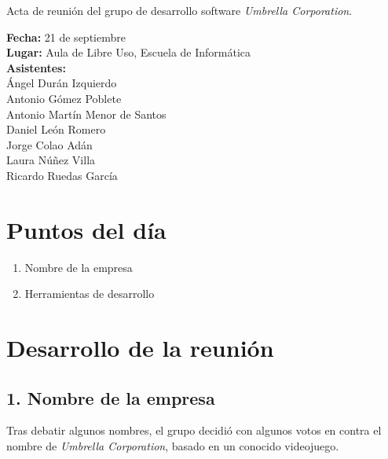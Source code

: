 \documentclass[a4paper,11pt,oneside]{article}
\begin{document}
\pagestyle{fancy}


\begin{center}
{\Large
Acta de reunión del grupo de desarrollo software \textit{Umbrella
Corporation}.}
\end{center}
\textbf{Fecha:} 21 de septiembre\\
\textbf{Lugar:} Aula de Libre Uso, Escuela de Informática\\
\textbf{Asistentes:}\\
\hspace*{1cm}Ángel Durán Izquierdo\\
\hspace*{1cm}Antonio Gómez Poblete\\
\hspace*{1cm}Antonio Martín Menor de Santos\\
\hspace*{1cm}Daniel León Romero\\
\hspace*{1cm}Jorge Colao Adán\\
\hspace*{1cm}Laura Núñez Villa\\
\hspace*{1cm}Ricardo Ruedas García


\section*{Puntos del día}

\begin{enumerate}
\item Nombre de la empresa
\item Herramientas de desarrollo
\end{enumerate}


\section*{Desarrollo de la reunión}

\subsection*{1. Nombre de la empresa}

Tras debatir algunos nombres, el grupo decidió con algunos votos en contra el
nombre de \textit{Umbrella Corporation}, basado en un conocido videojuego.
\end{document}
